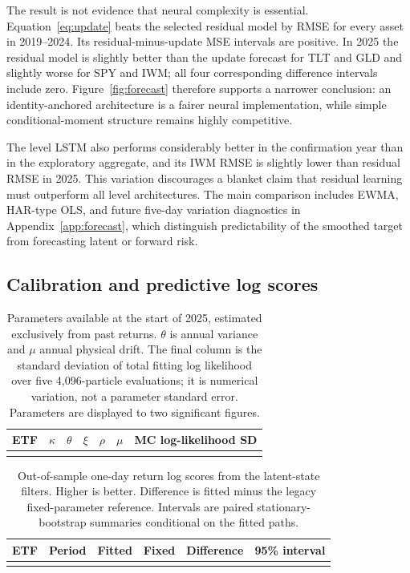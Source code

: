 The result is not evidence that neural complexity is essential. Equation~\eqref{eq:update} beats the selected residual model by RMSE for every asset in 2019--2024. Its residual-minus-update MSE intervals are positive. In 2025 the residual model is slightly better than the update forecast for TLT and GLD and slightly worse for SPY and IWM; all four corresponding difference intervals include zero. Figure~\ref{fig:forecast} therefore supports a narrower conclusion: an identity-anchored architecture is a fairer neural implementation, while simple conditional-moment structure remains highly competitive.

The level LSTM also performs considerably better in the confirmation year than in the exploratory aggregate, and its IWM RMSE is slightly lower than residual RMSE in 2025. This variation discourages a blanket claim that residual learning must outperform all level architectures. The main comparison includes EWMA, HAR-type OLS, and future five-day variation diagnostics in Appendix~\ref{app:forecast}, which distinguish predictability of the smoothed target from forecasting latent or forward risk.

\subsection{Calibration and predictive log scores}
\begin{table}[t]
\centering\small
\caption{Parameters available at the start of 2025, estimated exclusively from past returns. $\theta$ is annual variance and $\mu$ annual physical drift. The final column is the standard deviation of total fitting log likelihood over five 4,096-particle evaluations; it is numerical variation, not a parameter standard error. Parameters are displayed to two significant figures.}
\label{tab:calibration}
\begin{tabular}{lrrrrrr}\toprule
ETF&$\kappa$&$\theta$&$\xi$&$\rho$&$\mu$&MC log-likelihood SD\\\midrule
\\\bottomrule
\end{tabular}
\end{table}
\begin{table}[t]
\centering\small
\caption{Out-of-sample one-day return log scores from the latent-state filters. Higher is better. Difference is fitted minus the legacy fixed-parameter reference. Intervals are paired stationary-bootstrap summaries conditional on the fitted paths.}
\label{tab:logscores}
\begin{tabular}{llrrrr}\toprule
ETF&Period&Fitted&Fixed&Difference&95\% interval\\\midrule
\\\bottomrule
\end{tabular}
\end{table}

